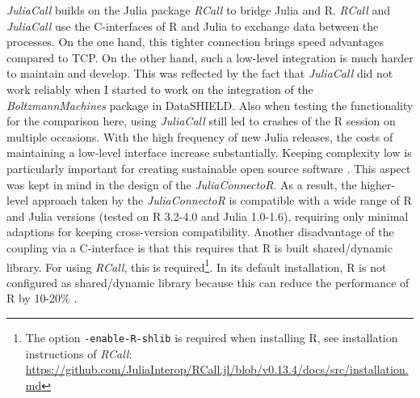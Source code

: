 \documentclass[12pt]{article}
\newcommand{\inlinecode}[1]{\texttt{#1}}
\newcommand{\apkg}[1]{\emph{#1}}
\begin{document}
\apkg{JuliaCall} builds on the Julia package \apkg{RCall} \citep{rcallGithub} to bridge Julia and R.
\apkg{RCall} and \apkg{JuliaCall} use the C-interfaces of R and Julia to exchange data between the processes.
On the one hand, this tighter connection brings speed advantages compared to TCP.
On the other hand, such a low-level integration is much harder to maintain and develop.
This was reflected by the fact that \apkg{JuliaCall} did not work reliably when I started to work on the integration of the \apkg{BoltzmannMachines} package in DataSHIELD.
Also when testing the functionality for the comparison here, using \apkg{JuliaCall} still led to crashes of the R session on multiple occasions.
With the high frequency of new Julia releases, the costs of maintaining a low-level interface increase substantially.
Keeping complexity low is particularly important for creating sustainable open source software \citep{midha_improving_2010}.
This aspect was kept in mind in the design of the \apkg{JuliaConnectoR}.
As a result, the higher-level approach taken by the \apkg{JuliaConnectoR} is compatible with a wide range of R and Julia versions (tested on R 3.2-4.0 and Julia 1.0-1.6), requiring only minimal adaptions for keeping cross-version compatibility.
Another disadvantage of the coupling via a C-interface is that this requires that R is built shared/dynamic library.
For using \apkg{RCall}, this is required\footnote{The option \inlinecode{-enable-R-shlib} is required when installing R, see installation instructions of \apkg{RCall}: \url{https://github.com/JuliaInterop/RCall.jl/blob/v0.13.4/docs/src/installation.md}}.
In its default installation, R is not configured as shared/dynamic library because this can reduce the performance of R by 10-20\% \citep{rAdmin}.
\end{document}
